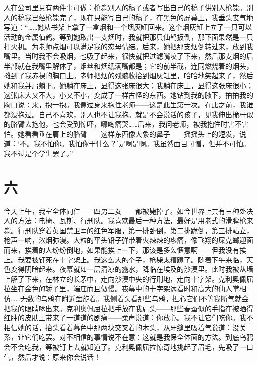 人在公司里只有两件事可做：枪毙别人的稿子或者写出自己的稿子供别人枪毙。别人的稿我已经枪毙完了，现在只能写自己的稿子，在黑色的屏幕上，我垂头丧气地写道：“……她从书架上拿了一盒烟和一个烟灰缸回来。这个烟灰缸上立了一只可以活动的金属仙鹤。等到她取出一支烟时，我就把那只仙鹤扳倒，那下面果然是一只打火机。为老师点烟可以满足我的恋母情结。后来，她把那支烟倒转过来，放到我嘴里。当时我不会吸烟，也吸了起来，很快就把过滤嘴咬了下来，然后那支烟的后半部就在我嘴里解体了，烟丝和烟纸满嘴都是；它的前半截，连同燃烧着的烟头，摊到了我赤裸的胸口上。老师把烟的残骸收拾到烟灰缸里，哈哈地笑起来了，然后她和我并肩躺下。她躺在床上，显得这张床很大；我躺在床上，显得这张床很小；这张床大又不大，小又不小，变成了一样古怪的东西。她钻到我的腋下，拍拍我的胸口说：来，抱一抱。我侧过身来抱住老师——这是此生第一次。在此之前，我谁都没抱过。自己不喜欢，别人也不让我抱。就是不会说话的孩子，见我伸出桅杆似的胳臂去抱他，也会受到惊吓，嚎啕痛哭……后来，我问老师，被我抱住时害不害怕。她看看垂在肩上的胳臂——这样东西像大象的鼻子——摇摇头上的短发，说道：‘不。我不怕你。我怕你干什么？’是啊是啊。我虽然面目可憎，但并不可怕。我不过是个学生罢了。” 



\section*{六} 

今天上午，我室全体同仁——四男二女——都被毙掉了。如今世界上共有三种处决人的方法：电椅、瓦斯、行刑队。我喜欢最后一种方法，最好是用老式的滑膛枪来毙。行刑队穿着英国禁卫军的红色军服，第一排卧倒，第二排跪倒，第三排站立，枪声一响，浓烟弥漫。大粒的平头铅子弹带着火辣辣的疼痛，像飞翔的屎克螂迎面而来，挨着的人纷纷倒地，如果能挨上一下，那该是多么惬意啊——但我没有挨上。我要被钉死在十字架上。我这么大的个子，枪毙太糟蹋了。随着下午来临，天色变得阴暗起来。夜幕就如一层清凉的露水，降临在埃及的沙漠里。此时我被从墙上解了下来，在林立的长矛中，走向沙漠中央的行刑地，走向十字架。克利奥佩屈拉坐在金色的轿子里，端庄而且傲慢。夜幕中的十字架远看时和高大的仙人掌相仿……无数的乌鸦在附近盘旋着。我侧着头看那些乌鸦，担心它们不等我断气就会把我的眼睛啄出来。克利奥佩屈拉把手放在我肩头——那些春蚕似的手指在被晒得红肿的皮肤上带来了一道道的剧痛——柔声说道：你放心。我不让它们吃你。我不相信她的话，抬头看着暮色中那两块交叉着的木头，从牙缝里吸着气说道：没关系，让它们吃罢。对不相信的事情说不在意：这就是我保全体面的方法。到底乌鸦会不会吃我，等被钉上去就知道了。克利奥佩屈拉惊奇地挑起了眉毛，先吸了一口气，然后才说：原来你会说话！ 

